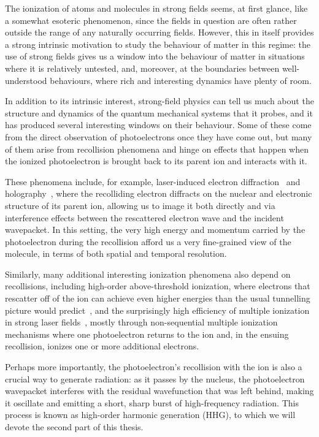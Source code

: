The ionization of atoms and molecules in strong fields seems, at first glance, like a somewhat esoteric phenomenon, since the fields in question are often rather outside the range of any naturally occurring fields. However, this in itself provides a strong intrinsic motivation to study the behaviour of matter in this regime: the use of strong fields gives us a window into the behaviour of matter in situations where it is relatively untested, and, moreover, at the boundaries between well-understood behaviours, where rich and interesting dynamics have plenty of room.

In addition to its intrinsic interest, strong-field physics can tell us much about the structure and dynamics of the quantum mechanical systems that it probes, and it has produced several interesting windows on their behaviour. Some of these come from the direct observation of photoelectrons once they have come out, but many of them arise from recollision phenomena and hinge on effects that happen when the ionized photoelectron is brought back to its parent ion and interacts with it.

These phenomena include, for example, laser-induced electron diffraction~\cite{spanner_reading-diffraction-images_2004, yurchenko_laser-induced-rescattering_2004, blaga_imaging_2012} and holography~\cite{huismans_holography-2011}, where the recolliding electron diffracts on the nuclear and electronic structure of its parent ion, allowing us to image it both directly and via interference effects between the rescattered electron wave and the incident wavepacket. In this setting, the very high energy and momentum carried by the photoelectron during the recollision afford us a very fine-grained view of the molecule, in terms of both spatial and temporal resolution.

Similarly, many additional interesting ionization phenomena also depend on recollisions, including high-order above-threshold ionization, where electrons that rescatter off of the ion can achieve even higher energies than the usual tunnelling picture would predict~\cite{paulus_ati-plateau_1994}, and the surprisingly high efficiency of multiple ionization in strong laser fields~\cite{walker_nsdi_1994}, mostly through non-sequential multiple ionization mechanisms where one photoelectron returns to the ion and, in the ensuing recollision, ionizes one or more additional electrons.

Perhaps more importantly, the photoelectron's recollision with the ion is also a crucial way to generate radiation: as it passes by the nucleus, the photoelectron wavepacket interferes with the residual wavefunction that was left behind, making it oscillate and emitting a short, sharp burst of high-frequency radiation. This process is known as high-order harmonic generation (HHG), to which we will devote the second part of this thesis.

